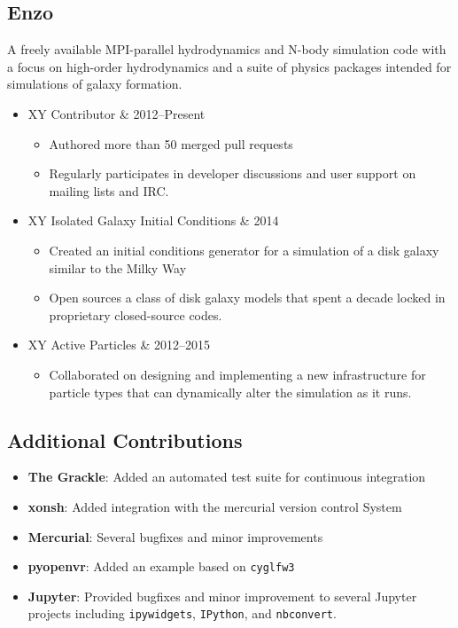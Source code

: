 \documentclass[10pt,letterpaper]{article}
\newcommand{\textline}[2]{
  \begin{tabularx}{\textwidth}{XY}
  #1 & #2
  \end{tabularx}
}
\begin{document}
\subsection*{Enzo}

A freely available MPI-parallel hydrodynamics and N-body simulation code with a
focus on high-order hydrodynamics and a suite of physics packages intended for
simulations of galaxy formation.

\begin{itemize}
\item[] \textline{Contributor}{2012--Present}
  \begin{itemize}
  \item Authored more than 50 merged pull requests
  \item Regularly participates in developer discussions and user support on mailing lists and IRC.
  \end{itemize}
\item[] \textline{Isolated Galaxy Initial Conditions}{2014}
  \begin{itemize}
  \item Created an initial conditions generator for a simulation of a disk
    galaxy similar to the Milky Way
  \item Open sources a class of disk galaxy models that spent a decade locked in
    proprietary closed-source codes.
  \end{itemize}
\item[] \textline{Active Particles}{2012--2015}
  \begin{itemize}
  \item Collaborated on designing and implementing a new infrastructure for
    particle types that can dynamically alter the simulation as it runs.
  \end{itemize}
\end{itemize}

\subsection*{Additional Contributions}

\begin{itemize}
\item[] {\bf The Grackle}: Added an automated test suite for continuous
  integration
\item[] {\bf xonsh}: Added integration with the mercurial version control System
\item[] {\bf Mercurial}: Several bugfixes and minor improvements
\item[] {\bf pyopenvr}: Added an example based on \texttt{cyglfw3}
\item[] {\bf Jupyter}: Provided bugfixes and minor improvement to several
  Jupyter projects including \texttt{ipywidgets}, \texttt{IPython}, and
  \texttt{nbconvert}.
\end{itemize}
\end{document}
